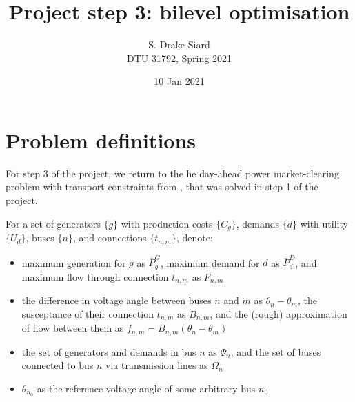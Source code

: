 \documentclass[11pt,a4paper]{article}
\title{\textbf{Project step 3: bilevel optimisation}}
\author{S. Drake Siard\\
DTU 31792, Spring 2021}
\date{10 Jan 2021}
\numberwithin{equation}{section}
\begin{document}
\newcommand{\pd}{\ensuremath{p^D_d}}
\newcommand{\ud}{\ensuremath{U_d}}
\newcommand{\pg}{\ensuremath{p^G_g}}
\newcommand{\cg}{\ensuremath{C_g}}
\newcommand{\bnm}{\ensuremath{B_{n,m}}}
\newcommand{\tnm}{\ensuremath{t_{n,m}}}
\newcommand{\fnm}{\ensuremath{f_{n,m}}}
\newcommand{\FNM}{\ensuremath{F_{n,m}}}
\newcommand{\PG}{\ensuremath{\overline{P}^G_g}}
\newcommand{\PD}{\ensuremath{\overline{P}^D_d}}

\newcommand{\mudup}{\ensuremath{\overline{\mu}_d^D}}
\newcommand{\muddown}{\ensuremath{\underline{\mu}_d^D}}
\newcommand{\mugup}{\ensuremath{\overline{\mu}_g^G}}
\newcommand{\mugdown}{\ensuremath{\underline{\mu}_g^G}}
\newcommand{\etaup}{\ensuremath{\overline{\eta}_{n,m}}}
\newcommand{\etadown}{\ensuremath{\underline{\eta}_{n,m}}}
\newcommand{\etaupm}{\ensuremath{\overline{\eta}_{m,n}}}
\newcommand{\etadownm}{\ensuremath{\underline{\eta}_{m,n}}}

\maketitle

\section{Problem definitions}

For step 3 of the project, we return to the he day-ahead power market-clearing problem with transport constraints from \cite{kazempourLectureMarketClearing2021}, that was solved in step 1 of the project.

For a set of generators $\{g\}$ with production costs $\{\cg\}$, demands $\{d\}$ with utility $\{\ud\}$, buses $\{n\}$, and connections $\{\tnm\}$, denote:
 \begin{itemize}
\item maximum generation for $g$ as $\PG$, maximum demand for $d$ as $\PD$, and maximum flow through connection $\tnm$ as $\FNM$
\item the difference in voltage angle between buses $n$ and $m$ as $\theta_n - \theta_m$, the susceptance of their connection $\tnm$ as $\bnm$, and the (rough) approximation of flow between them as $\fnm = \bnm(\theta_n - \theta_m)$
\item the set of generators and demands in bus $n$ as $\Psi_n$, and the set of buses connected to bus $n$ via transmission lines as $\Omega_n$
\item $\theta_{n_0}$ as the reference voltage angle of some arbitrary bus $n_0$
\end{itemize}
\end{document}
